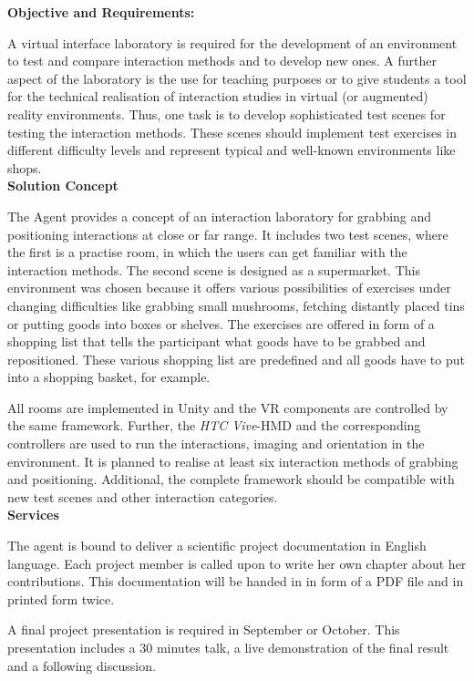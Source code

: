 \documentclass[a4paper, 12pt]{article}
\begin{document}
\textbf{Objective and Requirements:}

A virtual interface laboratory is required for the development of an environment to test and compare interaction methods and to develop new ones. A further aspect of the laboratory is the use for teaching purposes or to give students a tool for the technical realisation of interaction studies in virtual (or augmented) reality environments. Thus, one task is to develop sophisticated test scenes for testing the interaction methods. These scenes should implement test exercises in different difficulty levels and represent typical and well-known environments like shops. \\

\textbf{Solution Concept}
 
  The Agent provides a concept of an interaction laboratory for grabbing and positioning interactions at close or far range. It includes two test scenes, where the first is a practise room, in which the users can get familiar with the interaction methods. The second scene is designed as a supermarket. This environment was chosen because it offers various possibilities of exercises under changing difficulties like grabbing small mushrooms, fetching distantly placed tins or putting goods into boxes or shelves. The exercises are offered in form of a shopping list that tells the participant what goods have to be grabbed and repositioned. These various shopping list are predefined and all goods have to put into a shopping basket, for example. 
 
 All rooms are implemented in Unity and the VR components are controlled by the same framework. Further, the \textit{HTC Vive}-HMD and the corresponding controllers are used to run the interactions, imaging and orientation in the environment. It is planned to realise at least six interaction methods of grabbing and positioning. Additional, the complete framework should be compatible with new test scenes and other interaction categories. \\

 
\textbf{Services}

The agent is bound to deliver a scientific project documentation in English language. Each project member is called upon to write her own chapter about her contributions. This documentation will be handed in in form of a PDF file and in printed form twice. 

A final project presentation is required in September or October. This presentation includes a 30 minutes talk, a live demonstration of the final result and a following discussion.
\end{document}
